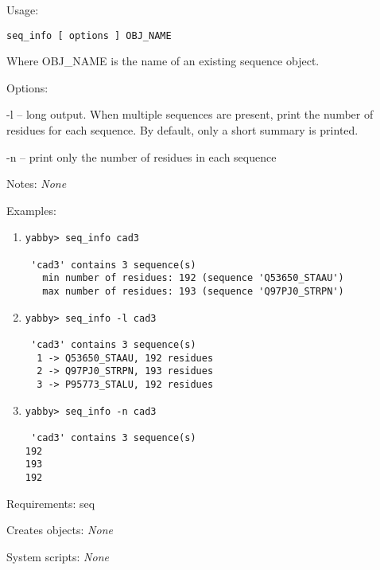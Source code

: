 \begin{description}


\item{Usage:}

{\tt seq\_info [ options ] OBJ\_NAME}

Where OBJ\_NAME is the name of an existing sequence object.


\item{Options:}
\begin{description}
\item -l -- long output.  When multiple sequences are present,
            print the number of residues for each sequence.
            By default, only a short summary is printed.
\item -n -- print only the number of residues in each sequence
\end{description}


\item{Notes:} {\em None}


\item{Examples:}
\begin{enumerate}

\item
\begin{verbatim}
yabby> seq_info cad3

 'cad3' contains 3 sequence(s)
   min number of residues: 192 (sequence 'Q53650_STAAU')
   max number of residues: 193 (sequence 'Q97PJ0_STRPN')

\end{verbatim}

\item
\begin{verbatim}
yabby> seq_info -l cad3

 'cad3' contains 3 sequence(s)
  1 -> Q53650_STAAU, 192 residues
  2 -> Q97PJ0_STRPN, 193 residues
  3 -> P95773_STALU, 192 residues

\end{verbatim}

\item
\begin{verbatim}
yabby> seq_info -n cad3

 'cad3' contains 3 sequence(s)
192
193
192

\end{verbatim}

\end{enumerate}


\item{Requirements:} seq


\item{Creates objects:} {\em None}


\item{System scripts:} {\em None}

\end{description}

